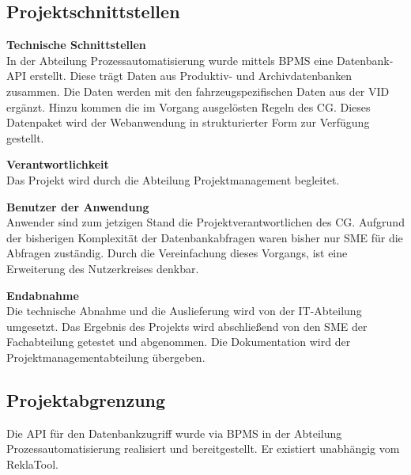 \subsection{Projektschnittstellen} 
\label{sec:Projektschnittstellen}
\textbf{Technische Schnittstellen}\\
In der Abteilung Prozessautomatisierung wurde mittels \acs{BPMS} eine Datenbank-\acs{API} erstellt.
Diese trägt Daten aus Produktiv- und Archivdatenbanken zusammen.
Die Daten werden mit den fahrzeugspezifischen Daten aus der \acs{VID} ergänzt.
Hinzu kommen die im Vorgang ausgelösten Regeln des \acs{CG}.
Dieses Datenpaket wird der Webanwendung in strukturierter Form zur Verfügung gestellt.

\textbf{Verantwortlichkeit}\\
Das Projekt wird durch die Abteilung Projektmanagement begleitet.

\textbf{Benutzer der Anwendung}\\
Anwender sind zum jetzigen Stand die Projektverantwortlichen des \acs{CG}.
Aufgrund der bisherigen Komplexität der Datenbankabfragen waren bisher nur \ac{SME}
für die Abfragen zuständig. Durch die Vereinfachung dieses Vorgangs, ist eine Erweiterung des Nutzerkreises denkbar.

\textbf{Endabnahme}\\
Die technische Abnahme und die Auslieferung wird von der IT-Abteilung umgesetzt.
Das Ergebnis des Projekts wird abschließend von den \acs{SME} der Fachabteilung getestet und abgenommen.
Die Dokumentation wird der Projektmanagementabteilung übergeben.

\subsection{Projektabgrenzung} 
\label{sec:Projektabgrenzung}
Die \acs{API} für den Datenbankzugriff wurde via \acs{BPMS} in der Abteilung Prozessautomatisierung realisiert und bereitgestellt. 
Er existiert unabhängig vom ReklaTool.
\clearpage